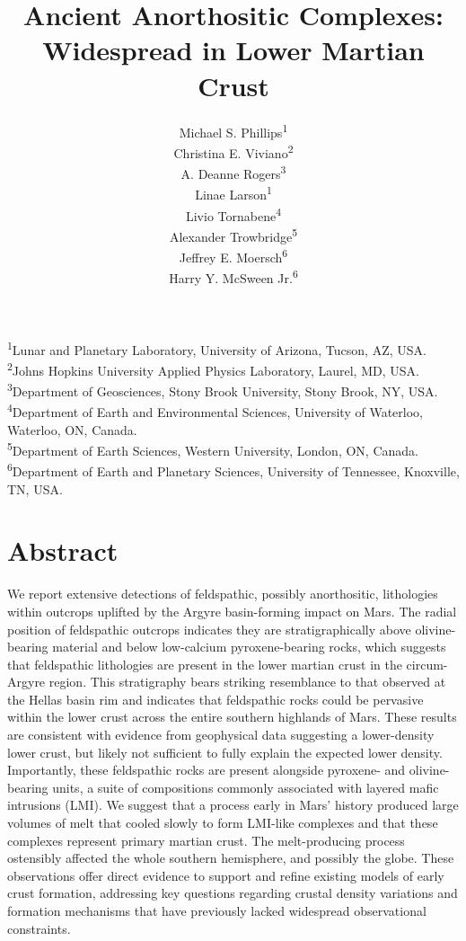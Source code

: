 \documentclass[11pt]{article}
\title{\textbf{Ancient Anorthositic Complexes: Widespread in Lower Martian Crust}}
\author{Michael S. Phillips\textsuperscript{1}\\ 
Christina E. Viviano\textsuperscript{2}\\
A. Deanne Rogers\textsuperscript{3}\\
Linae Larson\textsuperscript{1}\\
Livio Tornabene\textsuperscript{4}\\
Alexander Trowbridge\textsuperscript{5}\\
Jeffrey E. Moersch\textsuperscript{6}\\
Harry Y. McSween Jr.\textsuperscript{6}}
\begin{document}
\maketitle

\begin{flushleft}
\textsuperscript{1}Lunar and Planetary Laboratory, University of Arizona, Tucson, AZ, USA.\\
\textsuperscript{2}Johns Hopkins University Applied Physics Laboratory, Laurel, MD, USA.\\
\textsuperscript{3}Department of Geosciences, Stony Brook University, Stony Brook, NY, USA.\\
\textsuperscript{4}Department of Earth and Environmental Sciences, University of Waterloo, Waterloo, ON, Canada.\\
\textsuperscript{5}Department of Earth Sciences, Western University, London, ON, Canada.\\
\textsuperscript{6}Department of Earth and Planetary Sciences, University of Tennessee, Knoxville, TN, USA.\\
\end{flushleft}

\newpage
\section*{Abstract}
\setlength{\parindent}{0em} %
\setlength{\parskip}{6pt}   %
We report extensive detections of feldspathic, possibly anorthositic, lithologies within outcrops uplifted by the Argyre basin-forming impact on Mars. The radial position of feldspathic outcrops indicates they are stratigraphically above olivine-bearing material and below low-calcium pyroxene-bearing rocks, which suggests that feldspathic lithologies are present in the lower martian crust in the circum-Argyre region. This stratigraphy bears striking resemblance to that observed at the Hellas basin rim and indicates that feldspathic rocks could be pervasive within the lower crust across the entire southern highlands of Mars. These results are consistent with evidence from geophysical data suggesting a lower-density lower crust, but likely not sufficient to fully explain the expected lower density. Importantly, these feldspathic rocks are present alongside pyroxene- and olivine-bearing units, a suite of compositions commonly associated with layered mafic intrusions (LMI). We suggest that a process early in Mars' history produced large volumes of melt that cooled slowly to form LMI-like complexes and that these complexes represent primary martian crust. The melt-producing process ostensibly affected the whole southern hemisphere, and possibly the globe. These observations offer direct evidence to support and refine existing models of early crust formation, addressing key questions regarding crustal density variations and formation mechanisms that have previously lacked widespread observational constraints.
\end{document}
